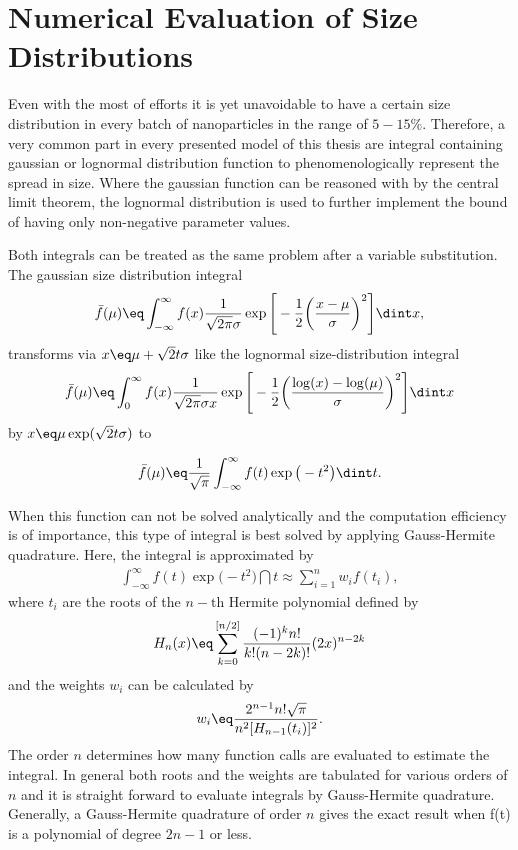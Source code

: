 \documentclass[\main/dresen_thesis.tex]{subfiles}
\begin{document}
\section{Numerical Evaluation of Size Distributions}\label{ch:appendix:numericalMethods:sizeDistributions}
Even with the most of efforts it is yet unavoidable to have a certain size distribution in every batch of nanoparticles in the range of $5 - 15 \%$.
Therefore, a very common part in every presented model of this thesis are integral containing gaussian or lognormal distribution function to phenomenologically represent the spread in size. Where the gaussian function can be reasoned with by the central limit theorem, the lognormal distribution is used to further implement the bound of having only non-negative parameter values.

Both integrals can be treated as the same problem after a variable substitution. 
The gaussian size distribution integral
\begin{align}
\bar{f}(\mu) \eq \int_{-\infty}^\infty f(x) \frac{1}{\sqrt{2\pi} \sigma} \exp \Bigg[- \frac{1}{2} \bigg(\frac{x-\mu}{\sigma}\bigg)^2 \Bigg] \dint x,
\end{align}
transforms via $x \eq \mu + \sqrt{2} t \sigma$ like the lognormal size-distribution integral
\begin{align}
\bar{f}(\mu) \eq \int_{0}^\infty f(x) \frac{1}{\sqrt{2\pi} \sigma x} \exp \Bigg[- \frac{1}{2} \bigg(\frac{\log(x)-\log(\mu)}{\sigma}\bigg)^2 \Bigg] \dint x
\end{align}
by $x \eq \mu \exp(\sqrt{2} t \sigma)$ to

\begin{align}
\bar{f}(\mu) \eq \frac{1}{\sqrt{\pi}} \int_{-\infty}^\infty f(t) \exp \big(- t^2 \big) \dint t.
\end{align}

When this function can not be solved analytically and the computation efficiency is of importance, this type of integral is best solved by applying Gauss-Hermite quadrature. Here, the integral is approximated by
\begin{align}
\int_{-\infty}^\infty f(t) \exp \big(- t^2 \big) \dint t \approx \sum_{i=1}^{n} w_i f(t_i),
\end{align}
where $t_{i}$ are the roots of the $n-\mathrm{th}$ Hermite polynomial defined by
\begin{align}
H_n (x) \eq \sum_{k=0}^{[n/2]} \frac{(-1)^k n!}{k! (n-2k)!} (2x)^{n-2k}
\end{align}
and the weights $w_{i}$ can be calculated by
\begin{align}
w_i \eq \frac{2^{n-1} n! \sqrt{\pi}}{n^2 [H_{n-1}(t_i)]^2}.
\end{align}
The order $n$ determines how many function calls are evaluated to estimate the integral. 
In general both roots and the weights are tabulated for various orders of $n$ and it is straight forward to evaluate integrals by Gauss-Hermite quadrature. 
Generally, a Gauss-Hermite quadrature of order $n$ gives the exact result when f(t) is a polynomial of degree $2n-1$ or less.
\end{document}

